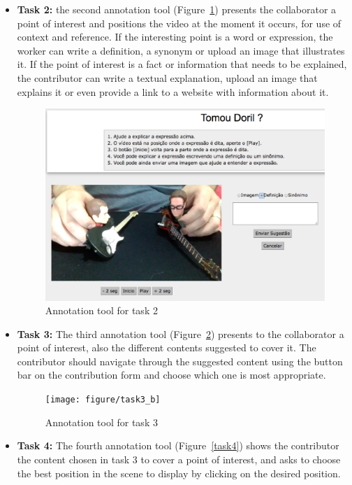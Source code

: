 \begin{itemize}
\begin{itemize}
\item \textbf{Task 2:} the second annotation tool (Figure~\ref{task2}) presents the collaborator a point of interest and positions the video at the moment it occurs, for use of context and reference. If the interesting point is a word or expression, the worker can write a definition, a synonym or upload an image that illustrates it. If the point of interest is a fact or information that needs to be explained, the contributor can write a textual explanation, upload an image that explains it or even provide a link to a website with information about it.
\begin{figure}[h]
	\centerline{\includegraphics[scale=0.21] {figure/task2_c}}
	\caption{Annotation tool for task 2}
	\label{task2}
\end{figure}  

\item \textbf{Task 3:} The third annotation tool (Figure~\ref{task3}) presents to the collaborator a point of interest, also the different contents suggested to cover it. The contributor should navigate through the suggested content using the button bar on the contribution form and choose which one is most appropriate. %

\begin{figure}[h]
	\centerline{\texttt{[image: figure/task3\_b]}}
	\caption{Annotation tool for task 3}
	\label{task3}
\end{figure}  	
	
	
\item \textbf{Task 4:} The fourth annotation tool (Figure~\ref{task4}) shows the contributor the content chosen in task 3 to cover a point of interest, and asks to choose the best position in the scene to display by clicking on the desired position.


\end{itemize}
\end{itemize}
